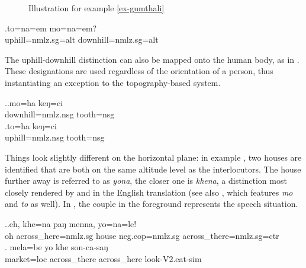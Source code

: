 \begin{figure}[t]
\centering
\setlength{\fboxsep}{0pt}
\caption{Illustration for example \ref{ex-gumthali}}\label{deixill-2}
\end{figure}

\exg.\label{ex-gumthali}to=na=em mo=na=em?\\
uphill{\sc =nmlz.sg=alt} downhill{\sc =nmlz.sg=alt}\\



The uphill-downhill distinction can also be mapped onto the human body, as in \Next. These designations are used regardless of the orientation of a person, thus instantiating an exception to the topography-based system.
\largerpage

\ex.\ag.mo=ha keŋ=ci \\
downhill{\sc =nmlz.nsg} tooth{\sc =nsg} \\
\bg.to=ha keŋ=ci\\
uphill{\sc =nmlz.nsg} tooth{\sc =nsg} \\


Things look slightly different on the horizontal plane: in example \Next[a], two houses are identified  that are both on the same altitude level as the interlocutors. The house further away is referred to as \emph{yona}, the closer one is \emph{khena}, a distinction most closely rendered by  and  in the English translation (see also , which  features  \emph{mo} and \emph{to} as well). In , the couple in the foreground represents the speech situation.

\ex.\ag.\label{khenamenna}eh, khe=na paŋ menna, yo=na=le!\\
oh across\_here{\sc =nmlz.sg} house {\sc neg.cop=nmlz.sg} across\_there{\sc =nmlz.sg=ctr}\\
 \bg. mela=be      yo   khe    son-ca-saŋ\\
market{\sc =loc} across\_there across\_here look{\sc -V2.eat-sim} \\
 
 
